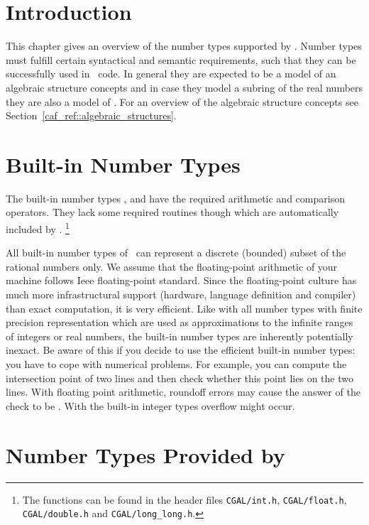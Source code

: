 \section{Introduction}

This chapter gives an overview of the number types supported by
\cgal. Number types must fulfill certain syntactical and semantic
requirements, such that they can be successfully used in \cgal\ code.
In general they are expected to be a model of an algebraic structure
concepts and in case they model a subring of the real numbers they are
also a model of . For an overview of the algebraic
structure concepts see Section~\ref{caf_ref::algebraic_structures}.

\section{Built-in Number Types}

The built-in number types ,  and  have
the required arithmetic and comparison operators. They lack some required
routines though which are automatically included by \cgal .
\footnote{ The functions can be found in the header files 
        {\tt CGAL/int.h}, {\tt CGAL/float.h}, {\tt CGAL/double.h} and
        {\tt CGAL/long\_long.h}.}


All built-in number types of \CC\ can represent a discrete (bounded)
subset of the rational numbers only.  We assume that the
floating-point arithmetic of your machine follows {\sc Ieee}
floating-point standard.  Since the floating-point culture has much
more infrastructural support (hardware, language definition and
compiler) than exact computation, it is very efficient.
Like with all number types with finite precision representation
which are used as approximations to the infinite ranges of 
integers or real numbers, the built-in number types are inherently
potentially inexact.
Be aware of this if you decide to use the efficient built-in 
number types: you have to cope with numerical problems.  
For example, you can compute the intersection point of two lines and 
then check whether this point lies on the two lines. 
With floating point arithmetic,
roundoff errors may cause the answer of the check to be . 
With the built-in integer types overflow might occur.

\section[Number Types Provided by CGAL]{Number Types Provided by \cgal}
\label{cgal-nt}

